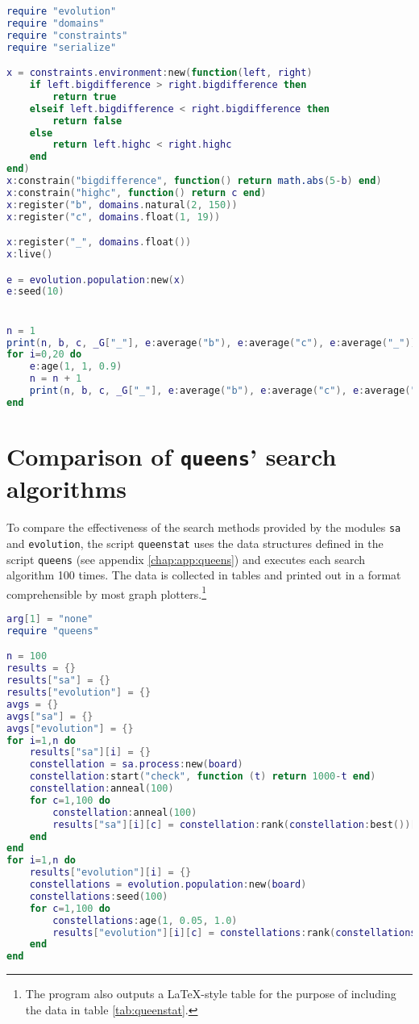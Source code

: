 \begin{appendices}
\begin{lstlisting}[language=lua, caption={Test program for self-adaptation of the mutation rate in the module \texttt{evolution}}, label=lst:adaptationperformance, name=lst:adaptationperformance]
require "evolution"
require "domains"
require "constraints"
require "serialize"

x = constraints.environment:new(function(left, right)
	if left.bigdifference > right.bigdifference then
		return true
	elseif left.bigdifference < right.bigdifference then
		return false
	else
		return left.highc < right.highc
	end
end)
x:constrain("bigdifference", function() return math.abs(5-b) end)
x:constrain("highc", function() return c end)
x:register("b", domains.natural(2, 150))
x:register("c", domains.float(1, 19))

x:register("_", domains.float())
x:live()

e = evolution.population:new(x)
e:seed(10)


n = 1
print(n, b, c, _G["_"], e:average("b"), e:average("c"), e:average("_"))
for i=0,20 do
    e:age(1, 1, 0.9)
    n = n + 1
    print(n, b, c, _G["_"], e:average("b"), e:average("c"), e:average("_"))
end
\end{lstlisting}


\section{Comparison of \texttt{queens}' search algorithms}
\label{sec:app:queensperformance}

To compare the effectiveness of the search methods provided by the modules \texttt{sa} and \texttt{evolution}, the script \texttt{queenstat} uses the data structures defined in the script \texttt{queens} (see appendix \ref{chap:app:queens}) and executes each search algorithm 100 times. The data is collected in tables and printed out in a format comprehensible by most graph plotters.\footnote{The program also outputs a \LaTeX-style table for the purpose of including the data in table \ref{tab:queenstat}.}

\begin{lstlisting}[language=lua, caption={Test program \texttt{queenstat} for collecting statistical data about the search mehotds used in \texttt{queens} (see appendix \ref{chap:app:queens})}, label=lst:queenstat, name=lst:queenstat]
arg[1] = "none"
require "queens"

n = 100
results = {}
results["sa"] = {}
results["evolution"] = {}
avgs = {}
avgs["sa"] = {}
avgs["evolution"] = {}
for i=1,n do
    results["sa"][i] = {}
    constellation = sa.process:new(board)
    constellation:start("check", function (t) return 1000-t end)
    constellation:anneal(100)
    for c=1,100 do
        constellation:anneal(100)
        results["sa"][i][c] = constellation:rank(constellation:best())["check"]
    end
end
for i=1,n do
    results["evolution"][i] = {}
    constellations = evolution.population:new(board)
    constellations:seed(100)
    for c=1,100 do
        constellations:age(1, 0.05, 1.0)
        results["evolution"][i][c] = constellations:rank(constellations:best())["check"]
    end
end


\end{lstlisting}
\end{appendices}
